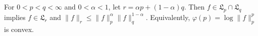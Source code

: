 For $0 < p < q < \infty$ and $0 < \alpha < 1$, let $r = \alpha p + (1-\alpha) q$. Then $f \in \mathfrak{L}_p \cap \mathfrak{L}_q$ implies $f \in \mathfrak{L}_r$ and $\|f\|_r \leq \|f\|_p^{\alpha} \|f\|_q^{1-\alpha}$. Equivalently, $\varphi(p) = \log \|f\|_p^p$ is convex.
